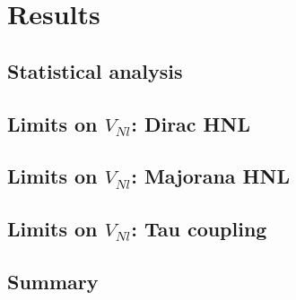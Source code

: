 \section{Results}
\subsection{Statistical analysis}
\subsection{Limits on $V_{Nl}$: Dirac HNL}
\subsection{Limits on $V_{Nl}$: Majorana HNL}
\subsection{Limits on $V_{Nl}$: Tau coupling}

\subsection{Summary}

